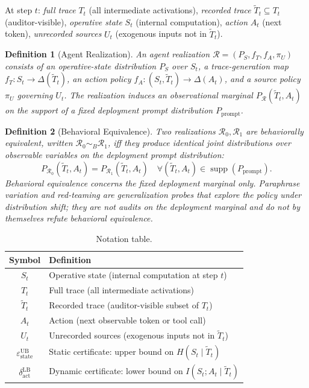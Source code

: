 \documentclass{article}
\newtheorem{definition}{Definition}
\begin{document}
At step $t$: \emph{full trace} $T_t$ (all intermediate activations), \emph{recorded trace} $\tilde T_t \subseteq T_t$ (auditor-visible), \emph{operative state} $S_t$ (internal computation), \emph{action} $A_t$ (next token), \emph{unrecorded sources} $U_t$ (exogenous inputs not in $\tilde T_t$).

\begin{definition}[Agent Realization]
\label{def:realization}
An \emph{agent realization} $\mathcal{R} = (P_S, f_T, f_A, \pi_U)$ consists of an operative-state distribution $P_S$ over $S_t$, a trace-generation map $f_T: S_t \to \Delta(\tilde T_t)$, an action policy $f_A: (S_t, \tilde T_t) \to \Delta(A_t)$, and a source policy $\pi_U$ governing $U_t$. The realization induces an observational marginal $P_{\mathcal{R}}(\tilde T_t, A_t)$ on the support of a fixed deployment prompt distribution $P_\text{prompt}$.
\end{definition}

\begin{definition}[Behavioral Equivalence]
\label{def:behavioral-equiv}
Two realizations $\mathcal{R}_0, \mathcal{R}_1$ are \emph{behaviorally equivalent}, written $\mathcal{R}_0 \sim_B \mathcal{R}_1$, iff they produce identical joint distributions over observable variables on the deployment prompt distribution:
\[
  P_{\mathcal{R}_0}(\tilde T_t, A_t) = P_{\mathcal{R}_1}(\tilde T_t, A_t) \quad \forall (\tilde T_t, A_t) \in \operatorname{supp}(P_\text{prompt}).
\]
Behavioral equivalence concerns the fixed deployment marginal only. Paraphrase variation and red-teaming are generalization probes that explore the policy under distribution shift; they are not audits on the deployment marginal and do not by themselves refute behavioral equivalence.
\end{definition}

\begin{table}[h]
\centering
\small
\begin{tabular}{c|l}
\toprule
Symbol & Definition \\
\midrule
$S_t$ & Operative state (internal computation at step $t$) \\
$T_t$ & Full trace (all intermediate activations) \\
$\tilde T_t$ & Recorded trace (auditor-visible subset of $T_t$) \\
$A_t$ & Action (next observable token or tool call) \\
$U_t$ & Unrecorded sources (exogenous inputs not in $\tilde T_t$) \\
$\varepsilon_\text{state}^\text{UB}$ & Static certificate: upper bound on $H(S_t \mid \tilde T_t)$ \\
$\delta_\text{act}^\text{LB}$ & Dynamic certificate: lower bound on $I(S_t; A_t \mid \tilde T_t)$ \\
\bottomrule
\end{tabular}
\caption{Notation table.}
\label{tab:symbols}
\end{table}
\end{document}
